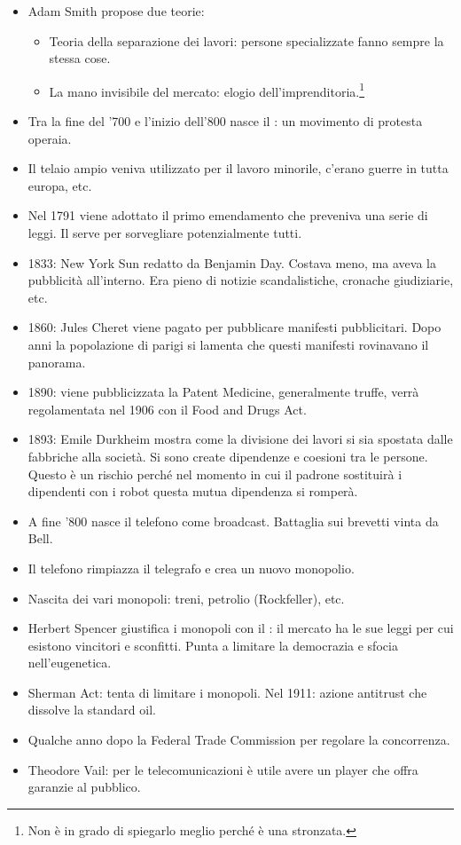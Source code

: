 \begin{itemize}
  \item Adam Smith propose due teorie:
    \begin{itemize}
      \item Teoria della separazione dei lavori: persone specializzate fanno sempre la stessa cose. 
      \item La mano invisibile del mercato: elogio dell'imprenditoria.\footnote{Non è in grado di spiegarlo meglio perché è una stronzata.}
    \end{itemize}
  \item Tra la fine del '700 e l'inizio dell'800 nasce il : un movimento di protesta operaia. 
  \item Il telaio ampio veniva utilizzato per il lavoro minorile, c'erano guerre in tutta europa, etc.
  \item Nel 1791 viene adottato il primo emendamento  che preveniva una serie di leggi. Il  serve per sorvegliare potenzialmente tutti.
  \item 1833: New York Sun redatto da Benjamin Day. Costava meno, ma aveva la pubblicità all'interno. Era pieno di notizie scandalistiche, cronache giudiziarie, etc.
  \item 1860: Jules Cheret viene pagato per pubblicare manifesti pubblicitari. Dopo anni la popolazione di parigi si lamenta che questi manifesti rovinavano il panorama.
  \item 1890: viene pubblicizzata la Patent Medicine, generalmente truffe, verrà regolamentata nel 1906 con il Food and Drugs Act.
  \item 1893: Emile Durkheim mostra come la divisione dei lavori si sia spostata dalle fabbriche alla società. Si sono create dipendenze e coesioni tra le persone. Questo è un rischio perché nel momento in cui il padrone sostituirà i dipendenti con i robot questa mutua dipendenza si romperà.
  \item A fine '800 nasce il telefono come broadcast. Battaglia sui brevetti vinta da Bell. 
  \item Il telefono rimpiazza il telegrafo e crea un nuovo monopolio. 
  \item Nascita dei vari monopoli: treni, petrolio (Rockfeller), etc. 
  \item Herbert Spencer giustifica i monopoli con il : il mercato ha le sue leggi per cui esistono vincitori e sconfitti. Punta a limitare la democrazia e sfocia nell'eugenetica.
  \item Sherman Act: tenta di limitare i monopoli. Nel 1911: azione antitrust che dissolve la standard oil. 
  \item Qualche anno dopo la Federal Trade Commission per regolare la concorrenza. 
  \item Theodore Vail: per le telecomunicazioni è utile avere un player che offra garanzie al pubblico. 
\end{itemize}

